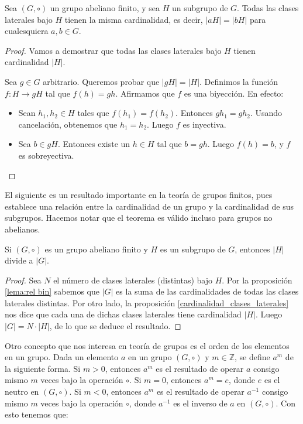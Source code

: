 \begin{prop} \label{cardinalidad_clases_laterales}
Sea $(G, \circ)$ un grupo abeliano finito, y sea $H$ un subgrupo de $G$. Todas las clases laterales bajo $H$ tienen la misma cardinalidad, es decir, $|aH| = |bH|$ para cualesquiera $a, b \in G$.
\end{prop}

\begin{proof}
Vamos a demostrar que todas las clases laterales bajo $H$ tienen cardinalidad $|H|$.

Sea $g \in G$ arbitrario. Queremos probar que $|gH| = |H|$. Definimos la función $f\colon H \rightarrow gH$ tal que $f(h) = gh$. Afirmamos que $f$ es una biyección. En efecto: 
\begin{itemize}
\item Sean $h_1, h_2 \in H$ tales que $f(h_1) = f(h_2)$. Entonces $gh_1 = gh_2$. Usando cancelación, obtenemos que $h_1 = h_2$. Luego $f$ es inyectiva.
\item Sea $b \in gH$. Entonces existe un $h \in H$ tal que $b = gh$. Luego $f(h) = b$, y $f$ es sobreyectiva.
\end{itemize}
\end{proof}


El siguiente es un resultado importante en la teoría de grupos finitos, pues establece una relación entre la cardinalidad de un grupo y la cardinalidad de sus subgrupos. Hacemos notar que el teorema es válido incluso para grupos no abelianos. 

\begin{theorem}
\label{teo:lagrange}
Si $(G, \circ)$ es un grupo abeliano finito y $H$ es un subgrupo de $G$, entonces $|H|$ divide a $|G|$.
\end{theorem}

\begin{proof}
Sea $N$ el número de clases laterales (distintas) bajo $H$. Por la proposición \ref{lema:rel bin} sabemos que $|G|$ es la suma de las cardinalidades de todas las clases laterales distintas. Por otro lado, la proposición \ref{cardinalidad_clases_laterales} nos dice que cada una de dichas clases laterales tiene cardinalidad $|H|$. Luego $|G| = N \cdot |H|$, de lo que se deduce el resultado.
\end{proof}

Otro concepto que nos interesa en teoría de grupos es el orden de los
elementos en un grupo.  Dada un elemento $a$ en un grupo $(G,\circ)$ y
$m \in \mathbb{Z}$, se define $a^m$ de la siguiente forma. Si $m > 0$,
entonces $a^m$ es el resultado de operar $a$ consigo mismo $m$ veces
bajo la operación $\circ$. Si $m = 0$, entonces $a^m = e$, donde $e$
es el neutro en $(G,\circ)$. Si $m < 0$, entonces $a^m$ es el
resultado de operar $a^{-1}$ consigo mismo $m$ veces bajo la operación
$\circ$, donde $a^{-1}$ es el inverso de $a$ en $(G, \circ)$. Con esto
tenemos que:

